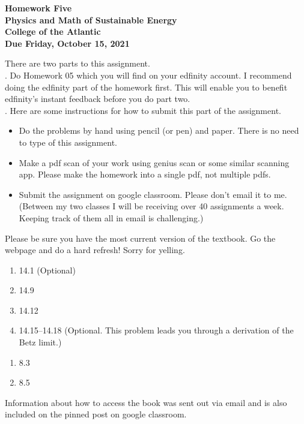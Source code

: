 \documentclass[12pt]{article}
\begin{document}
\pagestyle{empty}
 
\begin{center}
{\LARGE {\bf Homework Five}}\\
\bigskip
{\Large {\bf Physics and Math of Sustainable Energy}}\\
\bigskip
{\Large {\bf College of the Atlantic}}\\
\bigskip
{ {\bf Due Friday, October 15, 2021}}\\ 
\end{center}
\medskip


\noindent There are two parts to this assignment.\\

.  Do Homework 05 which you will find
on your edfinity account.  I recommend doing the edfinity part of the
homework first.  This will enable you to benefit edfinity's instant
feedback before you do part two.\\


.  Here are some
instructions for how to submit this part of the assignment.
\begin{itemize}
\item Do the problems by hand using pencil (or pen) and paper.
  There is no need to type of this assignment.
\item Make a pdf scan of your work using genius scan or some
  similar scanning app.  Please make the homework into a single
  pdf, not multiple pdfs.
\item Submit the assignment on google classroom.  Please don't
  email it to me.  (Between my two classes I will be receiving
  over 40 assignments a week.  Keeping track of them all in email
  is challenging.)\\
\end{itemize}


  Please be sure you have the most
current version of the textbook.  Go the webpage and do a hard
refresh!  Sorry for yelling.\\ 

\begin{enumerate}
\setlength{\itemsep}{-1mm}
\item 14.1 (Optional)
\item 14.9
\item 14.12
\item 14.15--14.18 (Optional. This problem leads you through a
    derivation of the Betz limit.) \\
\end{enumerate}

\begin{enumerate}
\setlength{\itemsep}{-1mm}
\item 8.3
\item 8.5\\
\end{enumerate}

\noindent Information about how to access the book was sent out
via email and is also included on the pinned post on google
classroom. 
\end{document}
